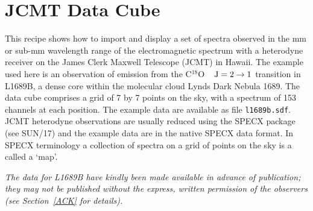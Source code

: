 \documentclass[twoside,11pt]{article}
\newcommand{\htmladdnormallink}[2]{#1}
\newcommand{\xref}[3]{#1}
\newcommand{\xlabel}[1]{}
\begin{document}
\newpage
\section{\xlabel{JCMT}\label{JCMT}JCMT Data Cube}

This recipe shows how to import and display a set of spectra observed
in the mm or sub-mm wavelength range of the electromagnetic spectrum
with a heterodyne receiver on the \htmladdnormallink{James Clerk Maxwell
Telescope}{http://www.jach.hawaii.edu/JCMT/index.html} (JCMT) in Hawaii.
The example used here is an observation of emission from the C$^{18}$O ~
${\rm J} = 2 \rightarrow 1$ transition in L1689B, a dense core within
the molecular cloud Lynds Dark Nebula 1689.  The data cube comprises a
grid of 7 by 7 points on the sky, with a spectrum of 153 channels at each
position.  The example data are available as file {\tt l1689b.sdf}.
JCMT heterodyne observations are usually reduced using the SPECX package
(see \xref{SUN/17}{sun17}{}\cite{SUN17}) and the example data are in the
native SPECX data format.  In SPECX terminology a collection of spectra
on a grid of points on the sky is a called a `map'.

{\it The data for L1689B have kindly been made available in advance of
publication; they may not be published without the express, written
permission of the observers (see Section~\ref{ACK} for details).}
\end{document}
